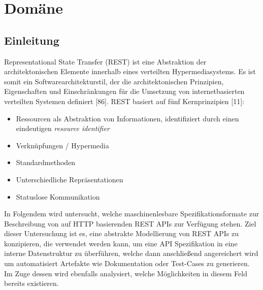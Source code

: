 
\section{Domäne}

\subsection{Einleitung}

Representational State Transfer (REST) ist eine Abstraktion der architektonischen Elemente innerhalb eines verteilten Hypermediasystems. Es ist somit ein Softwarearchitekturstil, der die architektonischen Prinzipien, Eigenschaften und Einschränkungen für die Umsetzung von internetbasierten verteilten Systemen definiert \cite{fielding2000architectural}[86]. REST basiert auf fünf Kernprinzipien \cite{tilkov2015rest}[11]:
\begin{itemize}
	\item Ressourcen als Abstraktion von Informationen, identifiziert durch einen eindeutigen \emph{resource identifier}
	\item Verknüpfungen / Hypermedia
	\item Standardmethoden
	\item Unterschiedliche Repräsentationen
	\item Statuslose Kommunikation
\end{itemize}

In Folgendem wird untersucht, welche maschinenlesbare Spezifikationsformate zur Beschreibung von auf HTTP basierenden REST APIs zur Verfügung stehen. Ziel dieser Untersuchung ist es, eine abstrakte Modellierung von REST APIs zu konzipieren, die verwendet werden kann, um eine API Spezifikation in eine interne Datenstruktur zu überführen, welche dann anschließend angereichert wird um automatisiert Artefakte wie Dokumentation oder Test-Cases zu generieren. Im Zuge dessen wird ebenfalls analysiert, welche Möglichkeiten in diesem Feld bereits existieren.
 